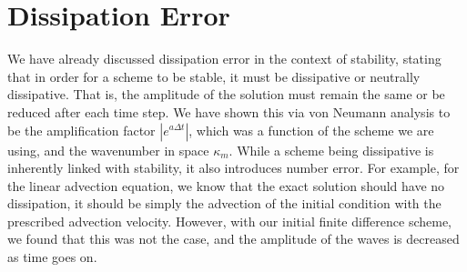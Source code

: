 \section{Dissipation Error}
We have already discussed dissipation error in the context of stability, stating that in order for a scheme to be stable, it must be dissipative or neutrally dissipative. That is, the amplitude of the solution must remain the same or be reduced after each time step. We have shown this via von Neumann analysis to be the amplification factor $|e^{a\Delta t}|$, which was a function of the scheme we are using, and the wavenumber in space $\kappa_m$. While a scheme being dissipative is inherently linked with stability, it also introduces number error. For example, for the linear advection equation, we know that the exact solution should have no dissipation, it should be simply the advection of the initial condition with the prescribed advection velocity. However, with our initial finite difference scheme, we found that this was not the case, and the amplitude of the waves is decreased as time goes on.

